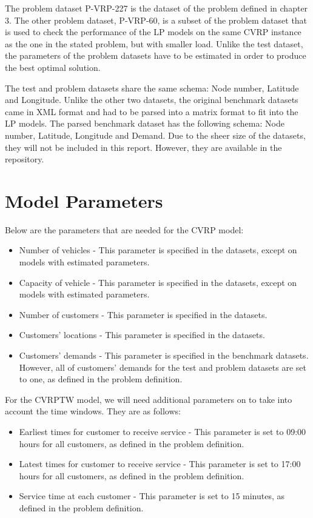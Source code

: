 The problem dataset P-VRP-227 is the dataset of the problem defined in chapter 3. The other problem dataset, P-VRP-60, is a subset of the problem dataset
that is used to check the performance of the LP models on the same CVRP instance as the one in the stated problem, but with smaller load.
Unlike the test dataset, the parameters of the problem datasets have to be estimated in order to produce the best optimal solution.

The test and problem datasets
share the same schema: Node number, Latitude and Longitude. Unlike the other two datasets, the original benchmark datasets came in
XML format and had to be parsed into a matrix format to fit into the LP models. The parsed benchmark dataset has the following schema:
Node number, Latitude, Longitude and Demand. Due to the sheer size of the datasets, they will not be included in this report. However,
they are available in the repository.

\section{Model Parameters}
Below are the parameters that are needed for the CVRP model:
\begin{itemize}
\item Number of vehicles - This parameter is specified in the datasets, except on models with estimated parameters.
\item Capacity of vehicle - This parameter is specified in the datasets, except on models with estimated parameters.
\item Number of customers - This parameter is specified in the datasets.
\item Customers' locations - This parameter is specified in the datasets.
\item Customers' demands - This parameter is specified in the benchmark datasets. However, all of customers' demands
for the test and problem datasets are set to one, as defined in the problem definition.
\end{itemize}

For the CVRPTW model, we will need additional parameters on to take into account the time windows. They are as follows:
\begin{itemize}
\item Earliest times for customer to receive service - This parameter is set to 09:00 hours for all customers, as defined in the problem definition.
\item Latest times for customer to receive service - This parameter is set to 17:00 hours for all customers, as defined in the problem definition.
\item Service time at each customer - This parameter is set to 15 minutes, as defined in the problem definition.
\end{itemize}


